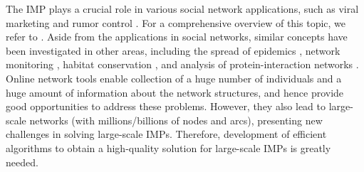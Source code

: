 \documentclass[a4paper,10pt]{article}
\theoremstyle{plain}
\newcommand{\revv}[1]{{#1}}
\begin{document}
	
	\revv{The IMP plays a crucial role in various social network applications, such as viral marketing \cite{Chen2010,domingos2001mining} and rumor control \cite{budak2011limiting,he2012influence}. 
		For a comprehensive overview of this topic, we refer to \cite{R1Chen2013}.  
		Aside from the applications in social networks, similar concepts have been  investigated in other areas, including the spread of epidemics \cite{R3borrero2021scalable,R2dreyer2009irreversible}, network monitoring \cite{Leskovec2007}, habitat conservation \cite{R4sheldon2012maximizing}, and analysis of protein-interaction networks \cite{R5jo2016influence}.}
	Online \revv{network} tools enable \revv{collection of} a huge number of individuals and a huge amount of
	information about the network structures, and hence provide good opportunities to address these problems. 
	However, they also lead to large-scale \revv{networks} (with
	millions/billions of nodes and arcs), presenting new challenges \revv{in solving} large-scale IMPs.
	Therefore, \revv{development of} efficient algorithms to obtain a high-quality solution for large-scale
	IMPs is greatly needed.
	
\end{document}
